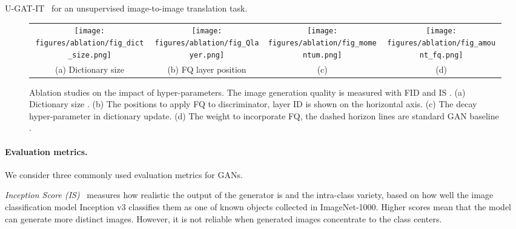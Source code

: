 \documentclass{article}
\begin{document}
U-GAT-IT~\cite{kim2019u} for an unsupervised image-to-image translation task.
\begin{figure*}[t!]\vspace{-0mm}\centering
	\begin{tabular}{c c c c}
		\hspace{-3mm}
		\texttt{[image: figures/ablation/fig\_dict\_size.png]}  & 
		\hspace{-4mm}
		\texttt{[image: figures/ablation/fig\_Qlayer.png]}  &
		\hspace{-4mm}
		\texttt{[image: figures/ablation/fig\_momentum.png]}  &
		\hspace{-4mm}
		\texttt{[image: figures/ablation/fig\_amount\_fq.png]} \\
		(a) Dictionary size \vspace{0mm} & 
		(b) FQ layer position \hspace{-0mm} & 
		(c)  \hspace{0mm} & 
		(d)  \hspace{-0mm} \\ 
	\end{tabular}
	\vspace{-3mm}
	\caption{Ablation studies on the impact of hyper-parameters. The image generation quality is measured with FID  and IS . (a) Dictionary size . (b) The positions to apply FQ to discriminator, layer ID is shown on the horizontal axis. (c) The decay hyper-parameter  in dictionary update. (d) The weight  to incorporate FQ, the dashed horizon lines are standard GAN baseline .
	 }
	\vspace{-4mm}
	\label{fig:ablation}
\end{figure*}


\paragraph{Evaluation metrics.}
 We consider three commonly used evaluation metrics for GANs.
 
    {\it Inception Score (IS)}~\citep{salimans2016improved}  measures how realistic the output of the generator is and the intra-class variety, based on how well the image classification model Inception v3 \citep{szegedy2016rethinking} classifies them as one of  known objects collected in ImageNet-1000. Higher scores mean that the model can generate more distinct images. However, it is not reliable when generated images concentrate to the class centers.
 
\end{document}
